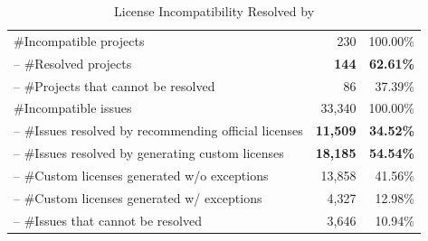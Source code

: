 \begin{table}[]
    \centering\footnotesize
    \caption{License Incompatibility Resolved by \tool}
    \begin{tabular}{lrr}
    \toprule
        {\#Incompatible projects} &  230 & 100.00\%\\ 
        {\space \space-- \#Resolved projects}  &  \textbf{144} & \textbf{62.61\%}\\
        {\space \space-- \#Projects that cannot be resolved}  &  {86} & {37.39\%}\\
        \midrule
        {\#Incompatible issues} &  33,340 & 100.00\%\\
        {\space \space-- \#Issues resolved by recommending official licenses} &  \textbf{11,509} & \textbf{34.52\%}\\
        {\space \space-- \#Issues resolved by generating custom licenses} &  \textbf{18,185} & \textbf{54.54\%}\\
        {\space \space\space\space\space\space-- \#Custom licenses generated w/o exceptions} & 13,858  & 41.56\%\\
        {\space \space\space\space\space\space-- \#Custom licenses generated w/ exceptions} &  4,327 & 12.98\%\\
        {\space \space-- \#Issues that cannot be resolved} &  3,646 & 10.94\%\\
        \bottomrule
    \end{tabular}
    \label{tab:resolve}
\end{table}

